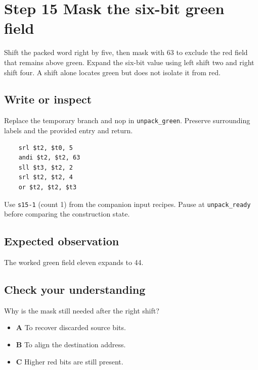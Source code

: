 \section{Step 15 Mask the six-bit green field}\label{rgb-s15}

Shift the packed word right by five, then mask with 63 to exclude the red field that remains above green. Expand the six-bit value using left shift two and right shift four. A shift alone locates green but does not isolate it from red.

\subsection{Write or inspect}
Replace the temporary branch and nop in \texttt{unpack\_green}. Preserve surrounding labels and the provided entry and return.

\begin{verbatim}
    srl $t2, $t0, 5
    andi $t2, $t2, 63
    sll $t3, $t2, 2
    srl $t2, $t2, 4
    or $t2, $t2, $t3
\end{verbatim}
Use \texttt{s15-1} (count 1) from the companion input recipes. Pause at \texttt{unpack\_ready} before comparing the construction state.

\subsection{Expected observation}
The worked green field eleven expands to 44.

\subsection{Check your understanding}
Why is the mask still needed after the right shift?

\begin{itemize}
  \item \textbf{A} To recover discarded source bits.
  \item \textbf{B} To align the destination address.
  \item \textbf{C} Higher red bits are still present.
\end{itemize}
